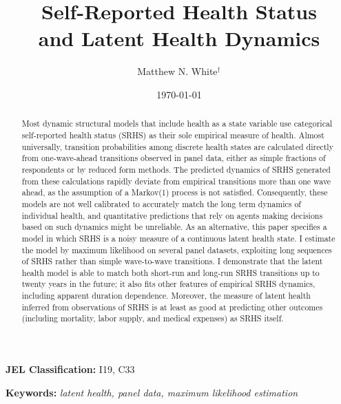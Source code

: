 \documentclass[12pt,pdftex,letterpaper]{article}
\begin{document}
\title{Self-Reported Health Status \\ and Latent Health Dynamics}
\author{Matthew N. White$^\dagger$}
\date{\today}

\begin{singlespace}
\maketitle

\begin{abstract}
	Most dynamic structural models that include health as a state variable use categorical self-reported health status (SRHS) as their sole empirical measure of health. Almost universally, transition probabilities among discrete health states are calculated directly from one-wave-ahead transitions observed in panel data, either as simple fractions of respondents or by reduced form methods.  The predicted dynamics of SRHS generated from these calculations rapidly deviate from empirical transitions more than one wave ahead, as the assumption of a Markov(1) process is not satisfied.  Consequently, these models are not well calibrated to accurately match the long term dynamics of individual health, and quantitative predictions that rely on agents making decisions based on such dynamics might be unreliable.  As an alternative, this paper specifies a model in which SRHS is a noisy measure of a continuous latent health state. I estimate the model by maximum likelihood on several panel datasets, exploiting long sequences of SRHS rather than simple wave-to-wave transitions.  I demonstrate that the latent health model is able to match both short-run and long-run SRHS transitions up to twenty years in the future; it also fits other features of empirical SRHS dynamics, including apparent duration dependence. Moreover, the measure of latent health inferred from observations of SRHS is at least as good at predicting other outcomes (including mortality, labor supply, and medical expenses) as SRHS itself.
\end{abstract}

\end{singlespace}

\noindent \textbf{JEL Classification:} I19, C33

\vspace{0.25cm}

\noindent \textbf{Keywords:} \textit{latent health, panel data, maximum likelihood estimation}
\end{document}

